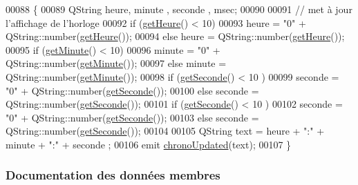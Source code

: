 \begin{DoxyCode}
00088 \{
00089    QString heure, minute , seconde , msec;
00090 
00091    \textcolor{comment}{// met à jour l'affichage de l'horloge}
00092    \textcolor{keywordflow}{if} (\hyperlink{class_chronometre_utilisation_a03c732560e07a2014129a7da8bb2307b}{getHeure}() < 10)
00093       heure = \textcolor{stringliteral}{"0"} + QString::number(\hyperlink{class_chronometre_utilisation_a03c732560e07a2014129a7da8bb2307b}{getHeure}());
00094    \textcolor{keywordflow}{else} heure = QString::number(\hyperlink{class_chronometre_utilisation_a03c732560e07a2014129a7da8bb2307b}{getHeure}());
00095    \textcolor{keywordflow}{if} (\hyperlink{class_chronometre_utilisation_a2c137076fcda83a14a5bad01b915196f}{getMinute}() < 10)
00096       minute = \textcolor{stringliteral}{"0"} + QString::number(\hyperlink{class_chronometre_utilisation_a2c137076fcda83a14a5bad01b915196f}{getMinute}());
00097    \textcolor{keywordflow}{else} minute = QString::number(\hyperlink{class_chronometre_utilisation_a2c137076fcda83a14a5bad01b915196f}{getMinute}());
00098    \textcolor{keywordflow}{if} (\hyperlink{class_chronometre_utilisation_a62dde8f710b8e015ba6124e8b44fe2da}{getSeconde}() < 10 )
00099        seconde = \textcolor{stringliteral}{"0"} + QString::number(\hyperlink{class_chronometre_utilisation_a62dde8f710b8e015ba6124e8b44fe2da}{getSeconde}());
00100    \textcolor{keywordflow}{else} seconde = QString::number(\hyperlink{class_chronometre_utilisation_a62dde8f710b8e015ba6124e8b44fe2da}{getSeconde}());
00101    \textcolor{keywordflow}{if} (\hyperlink{class_chronometre_utilisation_a62dde8f710b8e015ba6124e8b44fe2da}{getSeconde}() < 10 )
00102        seconde = \textcolor{stringliteral}{"0"} + QString::number(\hyperlink{class_chronometre_utilisation_a62dde8f710b8e015ba6124e8b44fe2da}{getSeconde}());
00103    \textcolor{keywordflow}{else} seconde = QString::number(\hyperlink{class_chronometre_utilisation_a62dde8f710b8e015ba6124e8b44fe2da}{getSeconde}());
00104 
00105    QString text = heure + \textcolor{stringliteral}{":"} + minute + \textcolor{stringliteral}{":"} + seconde  ;
00106    emit \hyperlink{class_chronometre_utilisation_ae4e197f888e33feb23801d2edcf2c4a5}{chronoUpdated}(text);
00107 \}
\end{DoxyCode}


\subsubsection{Documentation des données membres}
\mbox{\label{class_chronometre_utilisation_ae86620ca7d91c0d06c2e695493638bf2}} 
